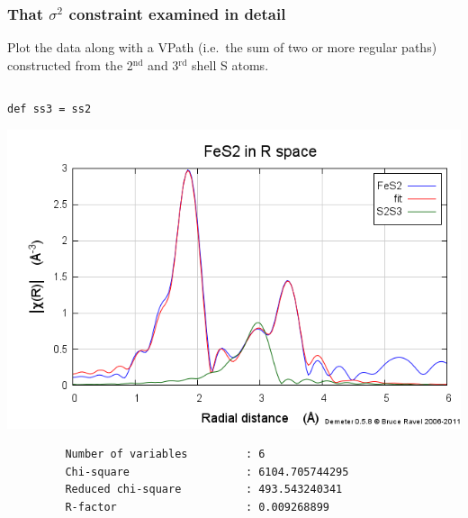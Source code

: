 \documentclass[10pt, xcolor=x11names, compress, handout]{beamer}
\begin{document}
\begin{frame}[fragile]
  \frametitle{That $\sigma^2$ constraint examined in detail}
  Plot the data along with a VPath (i.e.\ the sum of two or more
  regular paths) constructed from the 2$^{\mathrm{nd}}$ and
  3$^{\mathrm{rd}}$ shell S atoms.
  \begin{columns}[T]
    \begin{column}{0.5\linewidth}
      \begin{center}
        \texttt{{\color{defp}def} ss3 = ss2}
      \end{center}
      \includegraphics[width=\linewidth]{images/constrained.png}
      \tiny
\begin{verbatim}
         Number of variables         : 6
         Chi-square                  : 6104.705744295
         Reduced chi-square          : 493.543240341
         R-factor                    : 0.009268899


\end{verbatim}
\end{column}
\end{columns}
\end{frame}
\end{document}
